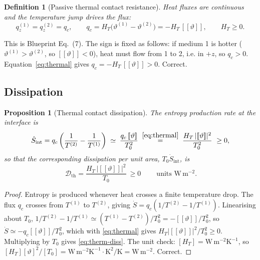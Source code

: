 \documentclass[11pt]{article}
\newcommand{\bth}{\vartheta}
\newcommand{\jmp}[1]{[\![#1]\!]}
\theoremstyle{plain}
\newtheorem{proposition}{Proposition}
\newtheorem{definition}{Definition}
\begin{document}
\begin{definition}[Passive thermal contact resistance]
\label{def:thermal}
Heat fluxes are continuous and the temperature jump drives the flux:
\begin{equation}
  q_z^{(1)} = q_z^{(2)} = q_c, \qquad
  q_c = H_T\big(\bth^{(1)} - \bth^{(2)}\big) = -H_T\,\jmp{\bth},
  \qquad H_T \ge 0 .
  \label{eq:thermal}
\end{equation}
\end{definition}
This is Blueprint Eq.~(7). The sign is fixed as follows: if medium 1 is hotter
($\bth^{(1)}>\bth^{(2)}$, so $\jmp{\bth}<0$), heat must flow from 1 to 2, i.e. in
$+z$, so $q_c>0$. Equation~\eqref{eq:thermal} gives
$q_c = -H_T\,\jmp{\bth} > 0$. Correct.

\subsection{Dissipation}

\begin{proposition}[Thermal contact dissipation]
\label{prop:therm-diss}
The entropy production rate at the interface is
\begin{equation}
  \dot S_{\mathrm{int}} = q_c\left(\frac{1}{T^{(2)}} - \frac{1}{T^{(1)}}\right)
  \;\simeq\; \frac{q_c\,\jmp{\bth}}{T_0^{2}}
  \;\overset{\eqref{eq:thermal}}{=}\;
  \frac{H_T\,\lvert\jmp{\bth}\rvert^{2}}{T_0^{2}} \ \ge 0 ,
  \label{eq:therm-entropy}
\end{equation}
so that the corresponding dissipation per unit area, $T_0\dot S_{\mathrm{int}}$,
is
\begin{equation}
  \boxed{\ \mathcal{D}_{\mathrm{th}} = \frac{H_T\,\lvert\jmp{\bth}\rvert^{2}}{T_0}
  \ \ge 0\ }\qquad \text{units } \mathrm{W\,m^{-2}}.
  \label{eq:therm-diss}
\end{equation}
\end{proposition}

\begin{proof}
Entropy is produced whenever heat crosses a finite temperature drop. The flux
$q_c$ crosses from $T^{(1)}$ to $T^{(2)}$, giving
$\dot S = q_c(1/T^{(2)}-1/T^{(1)})$. Linearising about $T_0$,
$1/T^{(2)}-1/T^{(1)} \simeq (T^{(1)}-T^{(2)})/T_0^2 = -\jmp{\bth}/T_0^2$, so
$\dot S \simeq -q_c\jmp{\bth}/T_0^2$, which with \eqref{eq:thermal} gives
$H_T\lvert\jmp{\bth}\rvert^2/T_0^2 \ge 0$. Multiplying by $T_0$ gives
\eqref{eq:therm-diss}. The unit check:
$[H_T]=\mathrm{W\,m^{-2}K^{-1}}$, so
$[H_T][\bth]^2/[T_0] = \mathrm{W\,m^{-2}K^{-1}}\cdot\mathrm{K^2}/\mathrm{K}
=\mathrm{W\,m^{-2}}$. Correct.
\end{proof}
\end{document}
